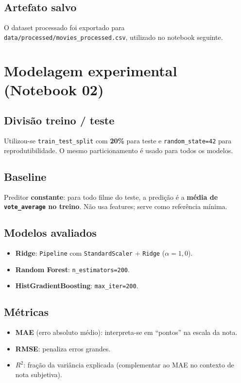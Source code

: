 \documentclass[11pt,a4paper]{article}
\begin{document}
\subsection{Artefato salvo}
O dataset processado foi exportado para \texttt{data/processed/movies\_processed.csv}, utilizado no notebook seguinte.

\section{Modelagem experimental (Notebook 02)}

\subsection{Divisão treino / teste}
Utilizou-se \texttt{train\_test\_split} com \textbf{20\%} para teste e \texttt{random\_state=42} para reprodutibilidade. O mesmo particionamento é usado para todos os modelos.

\subsection{Baseline}
Preditor \textbf{constante}: para todo filme do teste, a predição é a \textbf{média de \texttt{vote\_average} no treino}. Não usa features; serve como referência mínima.

\subsection{Modelos avaliados}
\begin{itemize}
  \item \textbf{Ridge}: \texttt{Pipeline} com \texttt{StandardScaler} + \texttt{Ridge} ($\alpha=1{,}0$).
  \item \textbf{Random Forest}: \texttt{n\_estimators=200}.
  \item \textbf{HistGradientBoosting}: \texttt{max\_iter=200}.
\end{itemize}

\subsection{Métricas}
\begin{itemize}
  \item \textbf{MAE} (erro absoluto médio): interpreta-se em ``pontos'' na escala da nota.
  \item \textbf{RMSE}: penaliza erros grandes.
  \item \textbf{$R^2$}: fração da variância explicada (complementar ao MAE no contexto de nota subjetiva).
\end{itemize}
\end{document}
